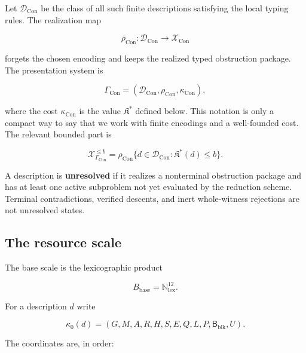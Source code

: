 \documentclass[11pt]{amsart}
\theoremstyle{definition}
\begin{document}
Let \(\mathcal D_{\mathrm{Con}}\) be the class of all such finite descriptions satisfying the local typing rules. The realization map

\[
\rho_{\mathrm{Con}}:\mathcal D_{\mathrm{Con}}\longrightarrow \mathcal X_{\mathrm{Con}}
\]

forgets the chosen encoding and keeps the realized typed obstruction package. The presentation system is

\[
\Gamma_{\mathrm{Con}}
=
(\mathcal D_{\mathrm{Con}},\rho_{\mathrm{Con}},\kappa_{\mathrm{Con}}),
\]

where the cost \(\kappa_{\mathrm{Con}}\) is the value \(\mathfrak K^\ast\) defined
below. This notation is only a compact way to say that we work with finite
encodings and a well-founded cost. The relevant bounded part is

\[
\mathcal X_{\Gamma_{\mathrm{Con}}}^{\le b}
=
\rho_{\mathrm{Con}}\{d\in\mathcal D_{\mathrm{Con}}:\mathfrak K^\ast(d)\le b\}.
\]

A description is \textbf{unresolved} if it realizes a nonterminal obstruction package
and has at least one active subproblem not yet evaluated by the reduction
scheme. Terminal contradictions, verified descents, and inert whole-witness
rejections are not unresolved states.

\subsection{The resource scale}

The base scale is the lexicographic product

\[
B_{\mathrm{base}}=\mathbb N_{\mathrm{lex}}^{12}.
\]

For a description \(d\) write

\[
\kappa_0(d)=
(G,M,A,R,H,S,E,Q,L,P,\mathsf B_{\mathrm{blk}},U).
\]

The coordinates are, in order:
\end{document}
